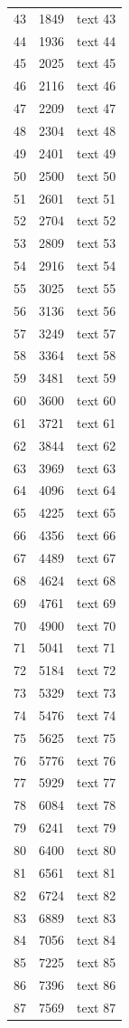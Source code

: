 \documentclass[10pt]{article}
\begin{document}
\begin{longtable}{rrl}
43&1849&text 43\\
44&1936&text 44\\
45&2025&text 45\\
46&2116&text 46\\
47&2209&text 47\\
48&2304&text 48\\
49&2401&text 49\\
50&2500&text 50\\
51&2601&text 51\\
52&2704&text 52\\
53&2809&text 53\\
54&2916&text 54\\
55&3025&text 55\\
56&3136&text 56\\
57&3249&text 57\\
58&3364&text 58\\
59&3481&text 59\\
60&3600&text 60\\
61&3721&text 61\\
62&3844&text 62\\
63&3969&text 63\\
64&4096&text 64\\
65&4225&text 65\\
66&4356&text 66\\
67&4489&text 67\\
68&4624&text 68\\
69&4761&text 69\\
70&4900&text 70\\
71&5041&text 71\\
72&5184&text 72\\
73&5329&text 73\\
74&5476&text 74\\
75&5625&text 75\\
76&5776&text 76\\
77&5929&text 77\\
78&6084&text 78\\
79&6241&text 79\\
80&6400&text 80\\
81&6561&text 81\\
82&6724&text 82\\
83&6889&text 83\\
84&7056&text 84\\
85&7225&text 85\\
86&7396&text 86\\
87&7569&text 87\\

\end{longtable}
\end{document}
